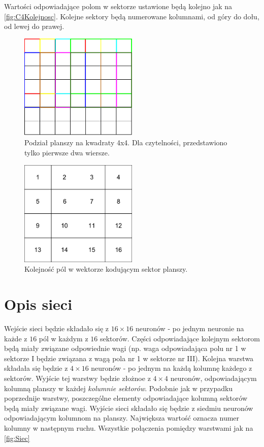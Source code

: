 \documentclass{llncs}
\begin{document}
Wartości odpowiadające polom w sektorze ustawione będą kolejno jak na \autoref{fig:C4Kolejnosc}. Kolejne sektory będą numerowane kolumnami, od góry do dołu, od lewej do prawej.

\begin{figure}
	\centering	
	\includegraphics[width=0.5\textwidth]{img/ConnectFour4x4.pdf}
	\caption{Podział planszy na kwadraty 4x4. Dla czytelności, przedstawiono tylko pierwsze dwa wiersze.}
	\label{fig:C4Podzial}
\end{figure}

\begin{figure}
	\centering	
	\includegraphics[width=0.5\textwidth]{img/ConnectFourOrder.pdf}	\caption{Kolejność pól w wektorze kodującym sektor planszy.}
	\label{fig:C4Kolejnosc}
\end{figure}

\section{Opis sieci}
Wejście sieci będzie składało się z $16 \times 16$ neuronów - po jednym neuronie na każde z $16$ pól w każdym z $16$ sektorów. Części odpowiadające kolejnym sektorom będą miały związane odpowiednie wagi (np. waga odpowiadająca polu nr 1 w sektorze I będzie związana z wagą pola nr 1 w sektorze nr III). Kolejna warstwa składała się będzie z $4 \times 16$ neuronów - po jednym na każdą kolumnę każdego z sektorów.
Wyjście tej warstwy będzie złożnoe z $4 \times 4$ neuronów, odpowiadającym kolumną planszy w każdej \emph{kolumnie sektorów}. Podobnie jak w przypadku 
poprzednije warstwy, poszczególne elementy odpowiadające kolumną sektorów będą miały związane wagi.
Wyjście sieci składało się będzie z siedmiu neuronów odpowiadającym kolumnom na planszy. Największa wartość oznacza numer kolumny w następnym ruchu.
Wszystkie połączenia pomiędzy warstwami jak na \autoref{fig:Siec}
\end{document}

